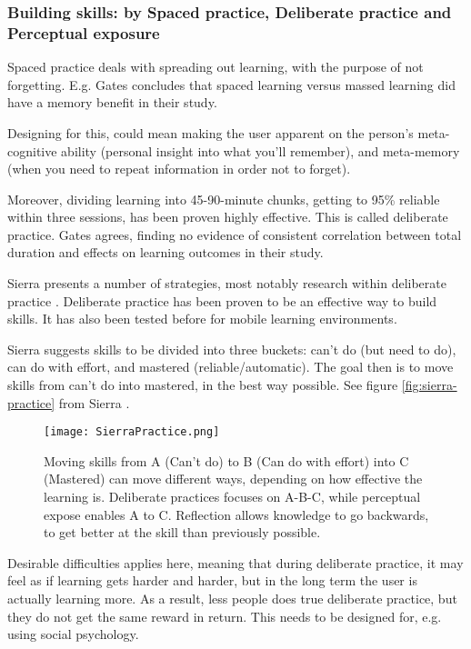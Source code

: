   \subsubsection{Building skills: by Spaced practice, Deliberate practice and Perceptual exposure}

  Spaced practice deals with spreading out learning, with the purpose of not forgetting. E.g. Gates \cite{Gates} concludes that spaced learning versus massed learning did have a memory benefit in their study.

  Designing for this, could mean making the user apparent on the person's meta-cognitive ability (personal insight into what you'll remember), and meta-memory (when you need to repeat information in order not to forget).

  Moreover, dividing learning into 45-90-minute chunks, getting to 95\% reliable within three sessions, has been proven highly effective. This is called deliberate practice. Gates \cite{Gates} agrees, finding no evidence of consistent correlation between total duration and effects on learning outcomes in their study.

  Sierra presents a number of strategies, most notably research within deliberate practice \cite{yengin} \cite{sierra}. Deliberate practice has been proven to be an effective way to build skills. It has also been tested before for mobile learning environments. \cite{yengin}

  Sierra \cite{sierra} suggests skills to be divided into three buckets: can't do (but need to do), can do with effort, and mastered (reliable/automatic). The goal then is to move skills from can't do into mastered, in the best way possible. See figure \ref{fig:sierra-practice} from Sierra \cite{sierra}.

  \begin{figure}[h]
    \centering
    \texttt{[image: SierraPractice.png]}
    \caption{Moving skills from A (Can't do) to B (Can do with effort) into C (Mastered) can move different ways, depending on how effective the learning is. Deliberate practices focuses on A-B-C, while perceptual expose enables A to C. Reflection allows knowledge to go backwards, to get better at the skill than previously possible.}
    \label{fig:iterationprocess}
\end{figure}

  Desirable difficulties applies here, meaning that during deliberate practice, it may feel as if learning gets harder and harder, but in the long term the user is actually learning more. As a result, less people does true deliberate practice, but they do not get the same reward in return. This needs to be designed for, e.g. using social psychology.

